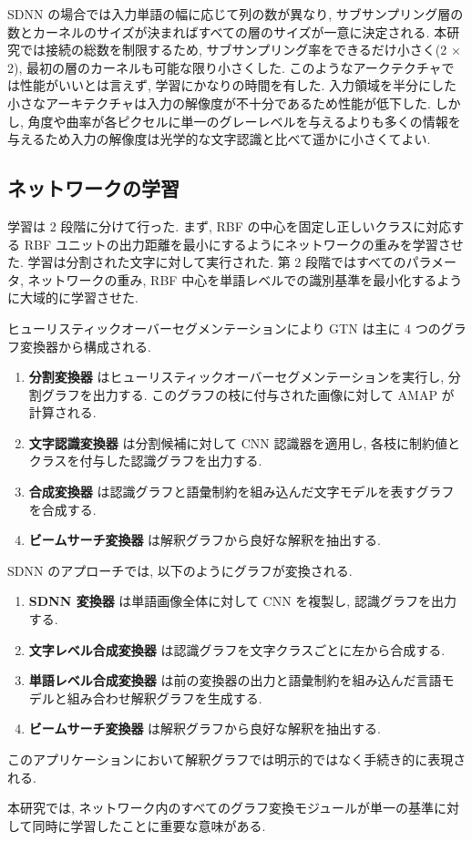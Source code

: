 \documentclass[twocolumn]{jarticle}     %
\begin{document}
SDNN の場合では入力単語の幅に応じて列の数が異なり, サブサンプリング層の数とカーネルのサイズが決まればすべての層のサイズが一意に決定される. 本研究では接続の総数を制限するため, サブサンプリング率をできるだけ小さく(2 × 2), 最初の層のカーネルも可能な限り小さくした. 
このようなアークテクチャでは性能がいいとは言えず, 学習にかなりの時間を有した. 入力領域を半分にした小さなアーキテクチャは入力の解像度が不十分であるため性能が低下した.
しかし, 角度や曲率が各ピクセルに単一のグレーレベルを与えるよりも多くの情報を与えるため入力の解像度は光学的な文字認識と比べて遥かに小さくてよい.

\subsection*{ネットワークの学習}
学習は 2 段階に分けて行った. まず, RBF の中心を固定し正しいクラスに対応する RBF ユニットの出力距離を最小にするようにネットワークの重みを学習させた. 学習は分割された文字に対して実行された. 
第 2 段階ではすべてのパラメータ, ネットワークの重み, RBF 中心を単語レベルでの識別基準を最小化するように大域的に学習させた. 
\par
ヒューリスティックオーバーセグメンテーションにより GTN は主に 4 つのグラフ変換器から構成される.
\begin{enumerate}
  \item \textbf{分割変換器} はヒューリスティックオーバーセグメンテーションを実行し, 分割グラフを出力する. このグラフの枝に付与された画像に対して AMAP が計算される. 
  \item \textbf{文字認識変換器} は分割候補に対して CNN 認識器を適用し, 各枝に制約値とクラスを付与した認識グラフを出力する. 
  \item \textbf{合成変換器} は認識グラフと語彙制約を組み込んだ文字モデルを表すグラフを合成する.
  \item \textbf{ビームサーチ変換器} は解釈グラフから良好な解釈を抽出する.
\end{enumerate}
SDNN のアプローチでは, 以下のようにグラフが変換される.
\begin{enumerate}
  \item \textbf{SDNN 変換器} は単語画像全体に対して CNN を複製し, 認識グラフを出力する. 
  \item \textbf{文字レベル合成変換器} は認識グラフを文字クラスごとに左から合成する. 
  \item \textbf{単語レベル合成変換器} は前の変換器の出力と語彙制約を組み込んだ言語モデルと組み合わせ解釈グラフを生成する.
  \item \textbf{ビームサーチ変換器} は解釈グラフから良好な解釈を抽出する.
\end{enumerate}
このアプリケーションにおいて解釈グラフでは明示的ではなく手続き的に表現される. 
\par
本研究では, ネットワーク内のすべてのグラフ変換モジュールが単一の基準に対して同時に学習したことに重要な意味がある.
\end{document}
